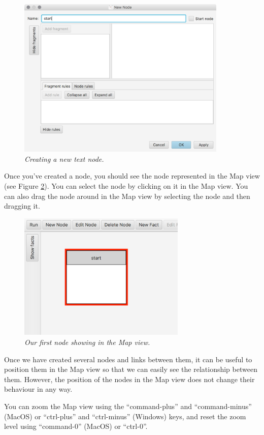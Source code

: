 \documentclass{article}
\begin{document}
\begin{figure}[ht]
  \centering
  \includegraphics[width=10cm]{images/hypedyn-tutorial-1-figure-3}
  \caption{\textit{Creating a new text node.}}
  \label{fig:tut1:new_node}
\end{figure} 

Once you've created a node, you should see the node represented in the Map view (see Figure \ref{fig:tut1:first_node}). You can select the
node by clicking on it in the Map view. You can also drag the node around in the Map view by selecting the node and then dragging it. 

\begin{figure}[ht]
  \centering \includegraphics[width=8cm]{images/hypedyn-tutorial-1-figure-4}
  \caption{\textit{Our first node showing in the Map view.}}
  \label{fig:tut1:first_node}
\end{figure} 

Once we have created several nodes and links between them, it can be useful to position them in the Map view so that we can easily see the relationship between them. However, the position of the nodes in the Map view does not change their behaviour in any way. 

You can zoom the Map view using the ``command-plus'' and ``command-minus'' (MacOS) or ``ctrl-plus'' and ``ctrl-minus'' (Windows) keys, and reset the zoom level using ``command-0'' (MacOS) or ``ctrl-0''.
\end{document}
